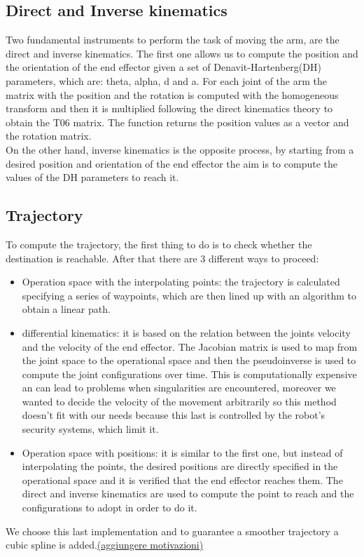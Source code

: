 \documentclass[12pt,a4paper]{article}
\begin{document}
\subsection{Direct and Inverse kinematics}\label{subsec:kinematics}
Two fundamental instruments to perform the task of moving the arm, are the direct and inverse kinematics. The first one allows us to compute the position and the orientation of the end effector given a set of Denavit-Hartenberg(DH) parameters, which are: theta, alpha, d and a. For each joint of the arm the matrix with the position and the rotation is computed with the homogeneous transform and then it is multiplied following the direct kinematics theory to obtain the T06 matrix. The function returns the position values as a vector and the rotation matrix.\\
On the other hand, inverse kinematics is the opposite process, by starting from a desired position and orientation of the end effector the aim is to compute the values of the DH parameters to reach it.

\subsection{Trajectory}\label{subsec:trajectory}
To compute the trajectory, the first thing to do is to check whether the destination is reachable. After that there are 3 different ways to proceed:
\begin{itemize}
    \item Operation space with the interpolating points: the trajectory is calculated specifying a series of waypoints, which are then lined up with an algorithm to obtain a linear path.
    \item differential kinematics: it is based on the relation between the joints velocity and the velocity of the end effector. The Jacobian matrix is used to map from the joint space to the operational space and then the pseudoinverse is used to compute the joint configurations over time. This is computationally expensive an can lead to problems when singularities are encountered, moreover we wanted to decide the velocity of the movement arbitrarily so this method doesn't fit with our needs because this last is controlled by the robot's security systems, which limit it.
    \item Operation space with positions: it is similar to the first one, but instead of interpolating the points, the desired positions are directly specified in the operational space and it is verified that the end effector reaches them. The direct and inverse kinematics are used to compute the point to reach and the configurations to adopt in order to do it. 
\end{itemize}    
We choose this last implementation and to guarantee a smoother trajectory a cubic spline is added.\uline{(aggiungere motivazioni)}
\end{document}
